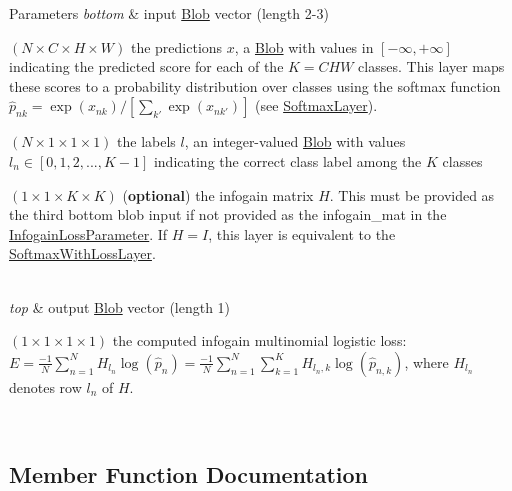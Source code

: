 \begin{DoxyParams}{Parameters}
{\em bottom} & input \mbox{\hyperlink{classcaffe_1_1_blob}{Blob}} vector (length 2-\/3)
\begin{DoxyEnumerate}
\item $ (N \times C \times H \times W) $ the predictions $ x $, a \mbox{\hyperlink{classcaffe_1_1_blob}{Blob}} with values in $ [-\infty, +\infty] $ indicating the predicted score for each of the $ K = CHW $ classes. This layer maps these scores to a probability distribution over classes using the softmax function $ \hat{p}_{nk} = \exp(x_{nk}) / \left[\sum_{k'} \exp(x_{nk'})\right] $ (see \mbox{\hyperlink{classcaffe_1_1_softmax_layer}{Softmax\+Layer}}).
\item $ (N \times 1 \times 1 \times 1) $ the labels $ l $, an integer-\/valued \mbox{\hyperlink{classcaffe_1_1_blob}{Blob}} with values $ l_n \in [0, 1, 2, ..., K - 1] $ indicating the correct class label among the $ K $ classes
\item $ (1 \times 1 \times K \times K) $ ({\bfseries optional}) the infogain matrix $ H $. This must be provided as the third bottom blob input if not provided as the infogain\+\_\+mat in the \mbox{\hyperlink{classcaffe_1_1_infogain_loss_parameter}{Infogain\+Loss\+Parameter}}. If $ H = I $, this layer is equivalent to the \mbox{\hyperlink{classcaffe_1_1_softmax_with_loss_layer}{Softmax\+With\+Loss\+Layer}}. 
\end{DoxyEnumerate}\\
\hline
{\em top} & output \mbox{\hyperlink{classcaffe_1_1_blob}{Blob}} vector (length 1)
\begin{DoxyEnumerate}
\item $ (1 \times 1 \times 1 \times 1) $ the computed infogain multinomial logistic loss\+: $ E = \frac{-1}{N} \sum\limits_{n=1}^N H_{l_n} \log(\hat{p}_n) = \frac{-1}{N} \sum\limits_{n=1}^N \sum\limits_{k=1}^{K} H_{l_n,k} \log(\hat{p}_{n,k}) $, where $ H_{l_n} $ denotes row $l_n$ of $H$. 
\end{DoxyEnumerate}\\
\hline
\end{DoxyParams}


\subsection{Member Function Documentation}
\mbox{\label{classcaffe_1_1_infogain_loss_layer_a6d8fc17daa7233fb96629b641fbc46ac}} 
